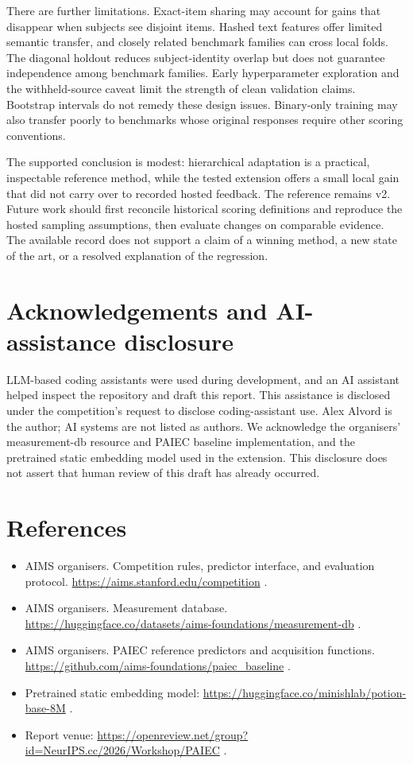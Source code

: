 \documentclass{article}
\providecommand{\tightlist}{\setlength{\itemsep}{0pt}\setlength{\parskip}{0pt}}
\begin{document}
There are further limitations. Exact-item sharing may account for gains that disappear when subjects see disjoint items. Hashed text features offer limited semantic transfer, and closely related benchmark families can cross local folds. The diagonal holdout reduces subject-identity overlap but does not guarantee independence among benchmark families. Early hyperparameter exploration and the withheld-source caveat limit the strength of clean validation claims. Bootstrap intervals do not remedy these design issues. Binary-only training may also transfer poorly to benchmarks whose original responses require other scoring conventions.

The supported conclusion is modest: hierarchical adaptation is a practical, inspectable reference method, while the tested extension offers a small local gain that did not carry over to recorded hosted feedback. The reference remains v2. Future work should first reconcile historical scoring definitions and reproduce the hosted sampling assumptions, then evaluate changes on comparable evidence. The available record does not support a claim of a winning method, a new state of the art, or a resolved explanation of the regression.

\section{Acknowledgements and AI-assistance disclosure}\label{acknowledgements-and-ai-assistance-disclosure}

LLM-based coding assistants were used during development, and an AI assistant helped inspect the repository and draft this report. This assistance is disclosed under the competition's request to disclose coding-assistant use. Alex Alvord is the author; AI systems are not listed as authors. We acknowledge the organisers' measurement-db resource and PAIEC baseline implementation, and the pretrained static embedding model used in the extension. This disclosure does not assert that human review of this draft has already occurred.
\label{main-text-end}
\clearpage
\section*{References}
\begin{itemize}
\tightlist
\item
  AIMS organisers. Competition rules, predictor interface, and evaluation protocol. \url{https://aims.stanford.edu/competition} .
\item
  AIMS organisers. Measurement database. \url{https://huggingface.co/datasets/aims-foundations/measurement-db} .
\item
  AIMS organisers. PAIEC reference predictors and acquisition functions. \url{https://github.com/aims-foundations/paiec_baseline} .
\item
  Pretrained static embedding model: \url{https://huggingface.co/minishlab/potion-base-8M} .
\item
  Report venue: \url{https://openreview.net/group?id=NeurIPS.cc/2026/Workshop/PAIEC} .
\end{itemize}
\clearpage
\end{document}
